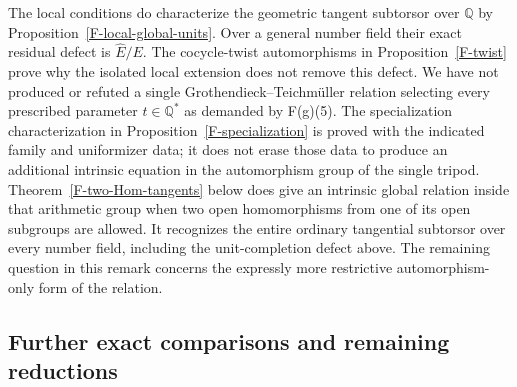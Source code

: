 \begin{remark}
\label{F-open-tangents}
The local conditions do characterize the geometric tangent
subtorsor over $\mathbb Q$ by
Proposition~\ref{F-local-global-units}. Over a general number
field their exact residual defect is $\widehat E/E$.
The cocycle-twist automorphisms in Proposition~\ref{F-twist}
prove why the isolated local extension does not remove this
defect. We have not produced or refuted a single
Grothendieck--Teichm\"uller relation selecting every prescribed
parameter $t\in\mathbb Q^*$ as demanded by F(g)(5). The
specialization characterization in
Proposition~\ref{F-specialization} is proved with the indicated
family and uniformizer data; it does not erase those data to
produce an additional intrinsic equation in the automorphism
group of the single tripod.
Theorem~\ref{F-two-Hom-tangents} below does give an intrinsic
global relation inside that arithmetic group when two open
homomorphisms from one of its open subgroups are allowed.
It recognizes the entire ordinary tangential subtorsor over
every number field, including the unit-completion defect above.
The remaining question in this remark concerns the expressly
more restrictive automorphism-only form of the relation.
\end{remark}

\subsection{Further exact comparisons and remaining reductions}

